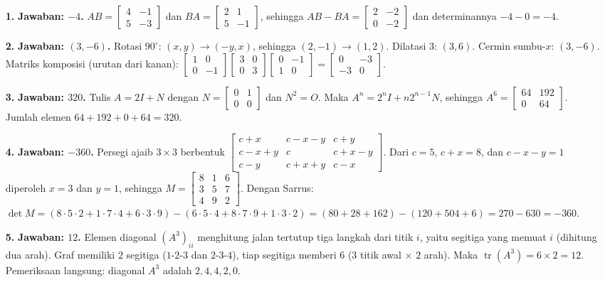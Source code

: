 \documentclass[a4paper,11pt]{article}
\newcommand{\sm}[1]{\left[\begin{smallmatrix}#1\end{smallmatrix}\right]}
\newcommand{\tr}{\operatorname{tr}}
\newcounter{no}
\begin{document}
\small\begin{enumerate}[leftmargin=2em,itemsep=2pt,topsep=2pt]
\item[\textbf{1.}] \textbf{Jawaban: $-4$.} $AB=\sm{4&-1\\5&-3}$ dan $BA=\sm{2&1\\5&-1}$, sehingga $AB-BA=\sm{2&-2\\0&-2}$ dan determinannya $-4-0=-4$.
\item[\textbf{2.}] \textbf{Jawaban: $(3,-6)$.} Rotasi $90^\circ$: $(x,y)\to(-y,x)$, sehingga $(2,-1)\to(1,2)$. Dilatasi $3$: $(3,6)$. Cermin sumbu-$x$: $(3,-6)$. Matriks komposisi (urutan dari kanan): $\sm{1&0\\0&-1}\sm{3&0\\0&3}\sm{0&-1\\1&0}=\sm{0&-3\\-3&0}$.
\item[\textbf{3.}] \textbf{Jawaban: $320$.} Tulis $A=2I+N$ dengan $N=\sm{0&1\\0&0}$ dan $N^2=O$. Maka $A^n=2^nI+n2^{n-1}N$, sehingga $A^6=\sm{64&192\\0&64}$. Jumlah elemen $64+192+0+64=320$.
\item[\textbf{4.}] \textbf{Jawaban: $-360$.} Persegi ajaib $3\times3$ berbentuk $\sm{c+x&c-x-y&c+y\\c-x+y&c&c+x-y\\c-y&c+x+y&c-x}$. Dari $c=5$, $c+x=8$, dan $c-x-y=1$ diperoleh $x=3$ dan $y=1$, sehingga $M=\sm{8&1&6\\3&5&7\\4&9&2}$. Dengan Sarrus: $\det M=(8\cdot5\cdot2+1\cdot7\cdot4+6\cdot3\cdot9)-(6\cdot5\cdot4+8\cdot7\cdot9+1\cdot3\cdot2)=(80+28+162)-(120+504+6)=270-630=-360$.
\item[\textbf{5.}] \textbf{Jawaban: $12$.} Elemen diagonal $(A^3)_{ii}$ menghitung jalan tertutup tiga langkah dari titik $i$, yaitu segitiga yang memuat $i$ (dihitung dua arah). Graf memiliki $2$ segitiga ($1\text{-}2\text{-}3$ dan $2\text{-}3\text{-}4$), tiap segitiga memberi $6$ ($3$ titik awal $\times$ $2$ arah). Maka $\tr(A^3)=6\times2=12$. Pemeriksaan langsung: diagonal $A^3$ adalah $2,4,4,2,0$.
\end{enumerate}
\par{}\par\vspace{0.2em}
\end{document}
